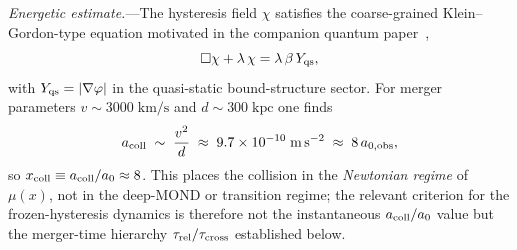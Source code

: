 \documentclass[11pt]{article}
\begin{document}
\textit{Energetic estimate.}---The hysteresis field $\chi$
satisfies the coarse-grained Klein--Gordon-type equation
motivated in the companion quantum paper~\cite{Lotishvili2026Q},
\begin{equation}
  \Box\chi + \lambda\,\chi = \lambda\,\beta\,Y_{\rm qs},
\end{equation}
with $Y_{\rm qs} = |\nabla\varphi|$ in the quasi-static
bound-structure sector.  For merger parameters
$v\sim3000\;\mathrm{km/s}$ and $d\sim300\;\mathrm{kpc}$ one
finds
\begin{equation}
  a_{\rm coll} \;\sim\; \frac{v^{2}}{d}
  \;\approx\; 9.7\times10^{-10}\;\mathrm{m\,s^{-2}}
  \;\approx\; 8\,a_{0,\rm obs},
\end{equation}
so $x_{\rm coll}\equiv a_{\rm coll}/a_0\approx 8$.  This places
the collision in the \emph{Newtonian regime} of $\mu(x)$, not in
the deep-MOND or transition regime; the relevant criterion for
the frozen-hysteresis dynamics is therefore not the instantaneous
$a_{\rm coll}/a_0$ value but the merger-time hierarchy
$\tau_{\rm rel}/\tau_{\rm cross}$ established below.
\end{document}
